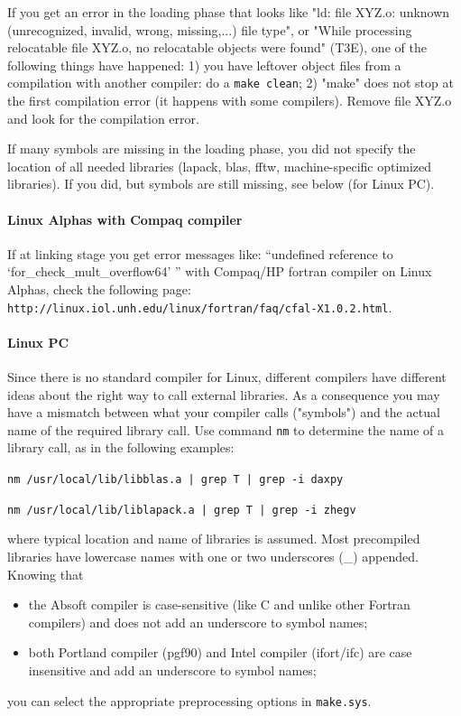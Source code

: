 \documentclass[12pt]{article}
\begin{document}
If you get an error in the loading phase that looks like "ld: file
XYZ.o: unknown (unrecognized, invalid, wrong, missing,...)  file type",
or "While processing relocatable file XYZ.o, no relocatable objects were
found" (T3E), one of the following things have happened:
1) you have leftover object files from a compilation with another 
   compiler: do a {\tt make clean};
2) "make" does not stop at the first compilation error (it happens
   with some compilers). Remove file XYZ.o and look for the 
   compilation error.

If many symbols are missing in the loading phase, you did not specify
the location of all needed libraries (lapack, blas, fftw,
machine-specific optimized libraries). If you did, but symbols are still
missing, see below (for Linux PC).

\paragraph{Linux Alphas with Compaq compiler}

If at linking stage you get error messages like: ``undefined reference
to `for\_check\_mult\_overflow64' '' with Compaq/HP fortran compiler on
Linux Alphas, check the following page:\\ 
{\tt http://linux.iol.unh.edu/linux/fortran/faq/cfal-X1.0.2.html}.

\paragraph{Linux PC}

Since there is no standard compiler for Linux, different compilers have
different ideas about the right way to call external libraries.  As a
consequence you may have a mismatch between what your compiler calls
("symbols") and the actual name of the required library call.  Use
command {\tt nm} to determine the name of a library call, as in the
following examples:

{\tt nm /usr/local/lib/libblas.a | grep T | grep -i daxpy } 

{\tt nm /usr/local/lib/liblapack.a | grep T | grep -i zhegv } 

\noindent where typical location and name of libraries is assumed. Most
precompiled libraries have lowercase names with one or two underscores
(\_) appended. Knowing that
\begin{itemize}
\item the Absoft compiler is case-sensitive (like C and unlike 
      other Fortran compilers) and does not add an underscore
      to symbol names;
\item both Portland compiler (pgf90) and Intel compiler (ifort/ifc) 
      are case insensitive and add an underscore to symbol names;
\end{itemize}
you can select the appropriate preprocessing options in {\tt make.sys}.
\end{document}
